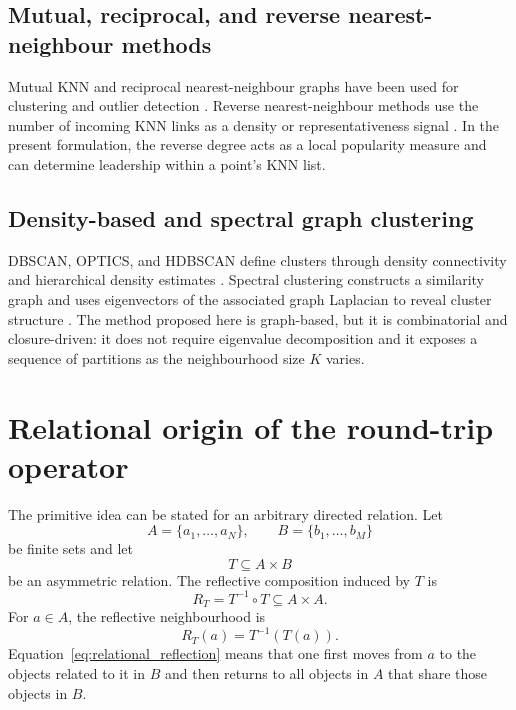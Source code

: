 \documentclass[pdflatex,sn-mathphys-num]{sn-jnl}
\begin{document}
\subsection{Mutual, reciprocal, and reverse nearest-neighbour methods}

Mutual KNN and reciprocal nearest-neighbour graphs have been used for clustering and outlier detection \citep{BritoChavezQuirozYukich1997,GowdaKrishna1978,SardanaBhatnagar2014}. Reverse nearest-neighbour methods use the number of incoming KNN links as a density or representativeness signal \citep{ChowdhuryAmorim2018}. In the present formulation, the reverse degree acts as a local popularity measure and can determine leadership within a point's KNN list.

\subsection{Density-based and spectral graph clustering}

DBSCAN, OPTICS, and HDBSCAN define clusters through density connectivity and hierarchical density estimates \citep{EsterKriegelSanderXu1996,AnkerstBreunigKriegelSander1999,CampelloMoulaviSander2013,CampelloMoulaviZimekSander2015}. Spectral clustering constructs a similarity graph and uses eigenvectors of the associated graph Laplacian to reveal cluster structure \citep{NgJordanWeiss2002,VonLuxburg2007}. The method proposed here is graph-based, but it is combinatorial and closure-driven: it does not require eigenvalue decomposition and it exposes a sequence of partitions as the neighbourhood size $K$ varies.

\section{Relational origin of the round-trip operator}\label{sec:relational_origin}

The primitive idea can be stated for an arbitrary directed relation. Let
\begin{equation}
A=\{a_1,\ldots,a_N\},\qquad B=\{b_1,\ldots,b_M\}
\end{equation}
be finite sets and let
\begin{equation}
T\subseteq A\times B
\end{equation}
be an asymmetric relation. The reflective composition induced by $T$ is
\begin{equation}
R_T=T^{-1}\circ T\subseteq A\times A.
\end{equation}
For $a\in A$, the reflective neighbourhood is
\begin{equation}
R_T(a)=T^{-1}(T(a)).
\label{eq:relational_reflection}
\end{equation}
Equation~\eqref{eq:relational_reflection} means that one first moves from $a$ to the objects related to it in $B$ and then returns to all objects in $A$ that share those objects in $B$.
\end{document}
